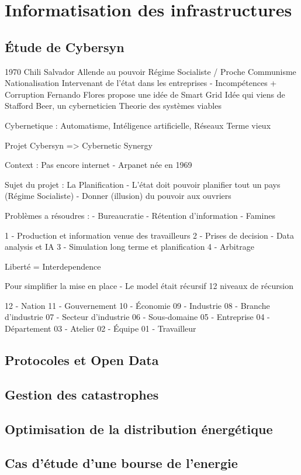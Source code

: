 \chapter{Informatisation des infrastructures}

\section{Étude de Cybersyn}

1970 Chili
Salvador Allende au pouvoir
Régime Socialiste / Proche Communisme
Nationalisation
Intervenant de l'état dans les entreprises - Incompétences + Corruption
Fernando Flores propose une idée de Smart Grid
Idée qui viens de Stafford Beer, un cyberneticien
Theorie des systèmes viables

Cybernetique : Automatisme, Intéligence artificielle, Réseaux
Terme vieux

Projet Cybersyn => Cybernetic Synergy

Context : Pas encore internet - Arpanet née en 1969

Sujet du projet : La Planification
- L'état doit pouvoir planifier tout un pays (Régime Socialiste)
- Donner (illusion) du pouvoir aux ouvriers

Problèmes a résoudres :
- Bureaucratie
- Rétention d'information
- Famines


1 - Production et information venue des travailleurs
2 - Prises de decision - Data analysis et IA
3 - Simulation long terme et planification
4 - Arbitrage

Liberté = Interdependence

Pour simplifier la mise en place - Le model était récursif
12 niveaux de récursion

12 - Nation
11 - Gouvernement
10 - Économie
09 - Industrie
08 - Branche d'industrie
07 - Secteur d'industrie
06 - Sous-domaine
05 - Entreprise
04 - Département
03 - Atelier
02 - Équipe
01 - Travailleur


\section{Protocoles et Open Data}
\section{Gestion des catastrophes}
\section{Optimisation de la distribution énergétique}
\section{Cas d'étude d'une bourse de l'energie}
